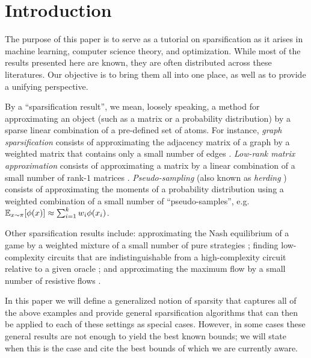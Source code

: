 \documentclass[paper.tex]{subfiles}
\begin{document}
\section{Introduction} 
\label{sec:intro}

The purpose of this paper is to serve as a tutorial on sparsification as it arises 
in machine learning, computer science theory, and optimization. While most of the 
results presented here are known, they are often distributed across these 
literatures. Our objective is to bring them all into one place, 
as well as to provide a unifying perspective.

By a ``sparsification result'', we mean, loosely speaking, a method for approximating an 
object (such as a matrix or a probability distribution) by a sparse linear 
combination of a pre-defined set of atoms. For instance, \emph{graph 
sparsification} consists of approximating the adjacency matrix of a graph by a 
weighted matrix that contains only a small number of edges \citep{?}. 
\emph{Low-rank matrix approximation} consists of approximating a matrix by a 
linear combination of a small number of rank-$1$ matrices \citep{?}. 
\emph{Pseudo-sampling} (also known as \emph{herding} \citep{?}) consists of 
approximating the moments of a probability distribution using a weighted 
combination of a small number of ``pseudo-samples'', e.g. 
$\mathbb{E}_{x \sim \pi}[\phi(x)] \approx \sum_{i=1}^k w_i \phi(x_i)$.

Other sparsification results include:  approximating the 
Nash equilibrium of a game by a weighted mixture of a small number of pure 
strategies \citep{?}; finding low-complexity circuits that are indistinguishable 
from a high-complexity circuit relative to a given oracle \citep{?}; and 
approximating the maximum flow by a small number of resistive flows \citep{?}.


In this paper we will define a generalized notion of sparsity that captures 
all of the above examples and provide general sparsification algorithms that 
can then be applied to each of these settings as special cases. However, in some 
cases these general results are not enough to yield the best known bounds; we will 
state when this is the case and cite the best bounds of which we are currently 
aware.
\end{document}
